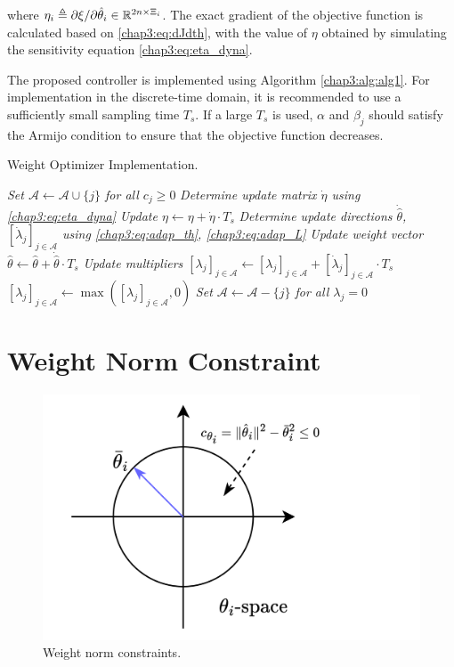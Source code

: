 where $\eta_i \triangleq \partial \xi/\partial \hat\theta_i\in\mathbb{R}^{2n\times \Xi_i}$. The exact gradient of the objective function is calculated based on \eqref{chap3:eq:dJdth}, with the value of $\eta$ obtained by simulating the sensitivity equation \eqref{chap3:eq:eta_dyna}.

The proposed controller is implemented using Algorithm \ref{chap3:alg:alg1}. For implementation in the discrete-time domain, it is recommended to use a sufficiently small sampling time $T_s$. If a large $T_s$ is used, $\alpha$ and $\beta_j$ should satisfy the Armijo condition \cite[Chap.~3 eq.~(3.4)]{RN9} to ensure that the objective function decreases.

\begin{algorithm}[t]
    \caption{Weight Optimizer Implementation.}\label{chap3:alg:alg1}
        \BlankLine
        \emph{Set $\mathcal A \leftarrow \mathcal A\cup \{j\}$ for all $c_j\ge0$}\;
        \emph{Determine update matrix $\dot\eta$ using \eqref{chap3:eq:eta_dyna}}\;
        \emph{Update $\eta\leftarrow \eta +\dot\eta\cdot T_s$}\; 
        \emph{Determine update directions $\dot{\hat\theta}$, $[\dot\lambda_j]_{j\in\mathcal A}$ using \eqref{chap3:eq:adap_th}, \eqref{chap3:eq:adap_L}}\;
        \emph{Update weight vector $\hat\theta\leftarrow \hat\theta+\dot{\hat\theta}\cdot T_s$}\;
        \emph{Update multipliers $[\lambda_j]_{j\in\mathcal A}\leftarrow [\lambda_j]_{j\in\mathcal A}+[\dot\lambda_j]_{j\in\mathcal A}\cdot T_s$}\;
        \emph{$[\lambda_j]_{j\in\mathcal A}\leftarrow \max([\lambda_j]_{j\in\mathcal A}, 0)$}\;
        \emph{Set $\mathcal A \leftarrow \mathcal A - \{j\}$ for all $\lambda_j=0$}\;
\end{algorithm}

\section{Weight Norm Constraint} \label{chap3:sec:weight_cstr}

\begin{figure}[t]
  \centering
  \includegraphics[width=0.5\linewidth]{imgs/cstr_weight.drawio.png}
  \caption{Weight norm constraints.}
  \label{chap3:fig:cstr:weight}
\end{figure}

